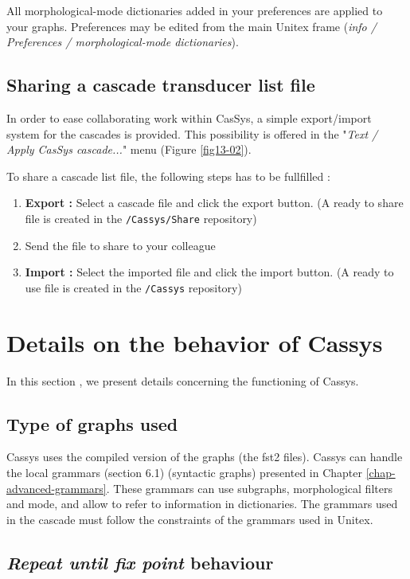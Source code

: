 All morphological-mode dictionaries added in your preferences are applied to your
graphs. Preferences may be edited from the main Unitex frame (\textit{info / Preferences / morphological-mode dictionaries}).

\subsection{Sharing a cascade transducer list file}
\label{subsec:shareCascade}

In order to ease collaborating work within CasSys, a  simple export/import
system for the cascades is provided. This possibility is offered in the "\textit{Text / Apply CasSys cascade...}" menu (Figure \ref{fig13-02}).

To share a cascade list file, the following steps has to be fullfilled :
\begin{enumerate}
  \item \textbf{Export :} Select a cascade file and click the export button. (A
  ready to share file is created in the \texttt{/Cassys/Share} repository)
  \item Send the file to share to your colleague
  \item \textbf{Import :} Select the imported file and click the import button.
  (A ready to use file is created in the \texttt{/Cassys} repository)
\end{enumerate}


\section{Details on the behavior of Cassys}

In this section , we present details concerning the functioning of Cassys.

\subsection{Type of graphs used}

Cassys uses the compiled version of the graphs (the fst2 files).
Cassys can handle the local grammars (section 6.1) (syntactic graphs) presented in Chapter \ref{chap-advanced-grammars}. These grammars can use subgraphs, morphological filters and mode, and allow to refer to information in dictionaries. 
The grammars used in the cascade must follow the constraints of the grammars used in Unitex.

\subsection{\textit{Repeat until fix point} behaviour}
\label{sub:AppWhiCon}

